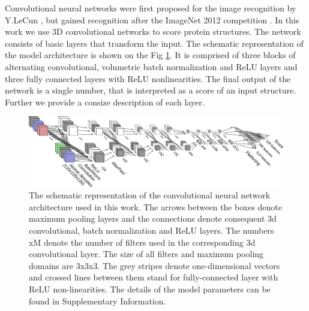 Convolutional neural networks were first proposed for the image recognition by Y.LeCun \cite{lecun1989backpropagation}, 
but gained recognition after the 
ImageNet 2012 competition \cite{krizhevsky2012imagenet}. 
In this work we use 3D convolutional networks to score protein structures. The network consists of 
basic layers that transform the input.
The schematic representation of the model architecture is shown on the Fig \ref{Fig:CNNModel}.
It is comprised of three blocks of alternating convolutional, 
volumetric batch normalization and ReLU layers and three 
fully connected layers with ReLU nonlinearities. The final output of the network is a single number, 
that is interpreted as a score of an input structure. Further we provide a consize description of each layer.

\begin{figure}[H]
    \centering
    \includegraphics[width=\linewidth]{Fig/ConvnetDiagramV1.png}
    \caption{The schematic representation of the convolutional neural network architecture used in this work. 
    The arrows between the boxes denote maximum pooling layers and the connections denote 
    consequent 3d convolutional, batch normalization and ReLU layers. The numbers xM denote the number of filters 
    used in the corresponding 3d convolutional layer. The size of all filters and 
    maximum pooling domains are 3x3x3. The grey stripes denote one-dimensional vectors and crossed lines between them 
    stand for fully-connected layer with ReLU non-linearities. The details of the model parameters can be found in 
    Supplementary Information.}
    \label{Fig:CNNModel}
\end{figure}

